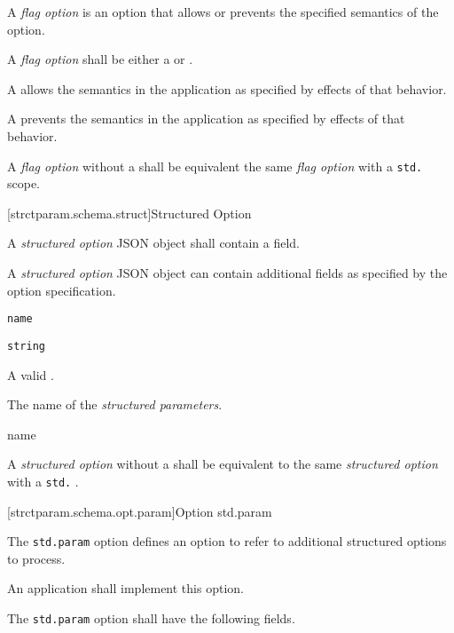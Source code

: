 \pnum
A \emph{flag option} is an option that allows or prevents the specified
semantics of the option.

\pnum
A \emph{flag option} shall be either a  or
.

\pnum
A  allows the semantics in the application as specified
by effects of that behavior.

\pnum
A  prevents the semantics in the application as specified
by effects of that behavior.

\pnum
A \emph{flag option} without a  shall be equivalent the same
\emph{flag option} with a \verb|std.| scope.

[strctparam.schema.struct]{Structured Option}

\pnum
A \emph{structured option} JSON object shall contain a
 field.

\pnum
A \emph{structured option} JSON object can contain additional fields as
specified by the option specification.

\begin{itemdescr}

	\pnum \fldname \verb|name|

	\pnum \fldtype \verb|string|

	\pnum \fldval
	A valid .

	\pnum \flddesc
	The name of the \emph{structured parameters}.

\end{itemdescr}

\pnum
\begin{ncbnf}

\br
	 name

\end{ncbnf}

\pnum
A \emph{structured option} without a  shall be equivalent to
the same \emph{structured option} with a \verb|std.| .

[strctparam.schema.opt.param]{Option std.param}

\pnum
The \verb|std.param| option defines an option to refer to additional structured
options  to process.

\pnum
An application shall implement this option.

\pnum
The \verb|std.param| option shall have the following fields.


